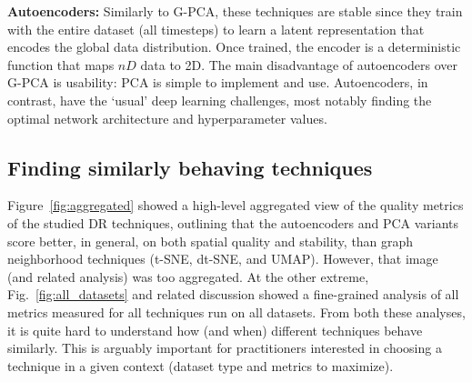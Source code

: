 \noindent\textbf{Autoencoders:} Similarly to G-PCA, these techniques are stable since they train with the entire dataset (all timesteps) to learn a latent representation that encodes the global data distribution. Once trained, the encoder is a deterministic function that maps $nD$ data to 2D. The main disadvantage of autoencoders over G-PCA is usability: PCA is simple to implement and use. Autoencoders, in contrast, have the `usual' deep learning challenges, most notably finding the optimal network architecture and hyperparameter values.





\subsection{Finding similarly behaving techniques}
\label{sec:choice}
%
Figure~\ref{fig:aggregated} showed a high-level aggregated view of the quality metrics of the studied DR techniques, outlining that the autoencoders and PCA variants score better, in general, on both spatial quality and stability, than graph neighborhood techniques (t-SNE, dt-SNE, and UMAP). However, that image (and related analysis) was too aggregated. At the other extreme, Fig.~\ref{fig:all_datasets} and related discussion showed a fine-grained analysis of all metrics measured for all techniques run on all datasets. From both these analyses, it is quite hard to understand how (and when) different techniques behave similarly. This is arguably important for practitioners interested in choosing a technique in a given context (dataset type and metrics to maximize).

